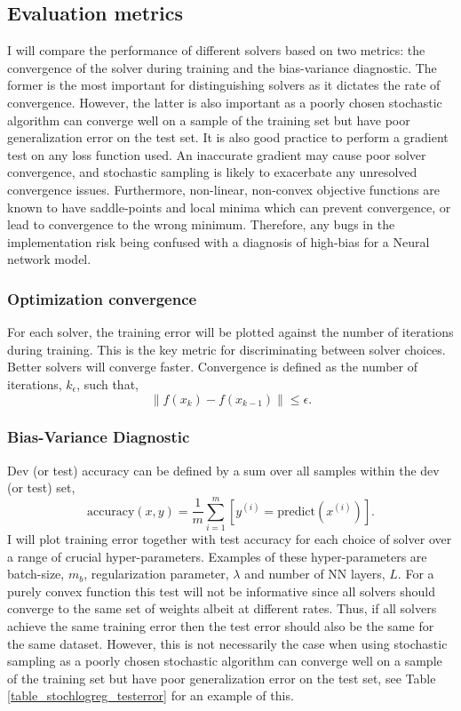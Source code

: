 \documentclass[11pt,twocolumn]{article}
\begin{document}
\subsection{Evaluation metrics}
I will compare the performance of different solvers based on two metrics: the convergence of the solver during training and the bias-variance diagnostic. The former is the most important for distinguishing solvers as it dictates the rate of convergence. However, the latter is also important as a poorly chosen stochastic algorithm can converge well on a sample of the training set but have poor generalization error on the test set.  It is also good practice to perform a gradient test on any loss function used.  An inaccurate gradient may cause poor solver convergence, and stochastic sampling is likely to exacerbate any unresolved convergence issues. Furthermore, non-linear, non-convex objective functions are known to have saddle-points and local minima which can prevent convergence, or lead to convergence to the wrong minimum. Therefore, any bugs in the implementation risk being confused with a diagnosis of high-bias for a Neural network model.

\subsubsection*{Optimization convergence}\label{metric_conv_curve}
For each solver, the training error will be plotted against the number of iterations during training. This is the key metric for discriminating between solver choices. Better solvers will converge faster. Convergence is defined as the number of iterations, $k_{\epsilon}$, such that,
\begin{equation}
\| f(x_{k})-f(x_{k-1}) \| \le \epsilon.
\end{equation}

\subsubsection*{Bias-Variance Diagnostic}\label{bias_variance}
Dev (or test) accuracy can be defined by a sum over all samples within the dev (or test) set,
\begin{equation}
\textrm{accuracy}(x,y)=\frac{1}{m}\sum_{i=1}^{m}[y^{(i)}=\textrm{predict}(x^{(i)})].
\end{equation}
I will plot training error together with test accuracy for each choice of solver over a range of crucial hyper-parameters. Examples of these hyper-parameters are batch-size, $m_b$, regularization parameter, $\lambda$ and number of NN layers, $L$. For a purely convex function this test will not be informative since all solvers should converge to the same set of weights albeit at different rates. Thus, if all solvers achieve the same training error then the test error should also be the same for the same dataset. However, this is not necessarily the case when using stochastic sampling as a poorly chosen stochastic algorithm can converge well on a sample of the training set but have poor generalization error on the test set, see Table \ref{table_stochlogreg_testerror} for an example of this.
\end{document}
